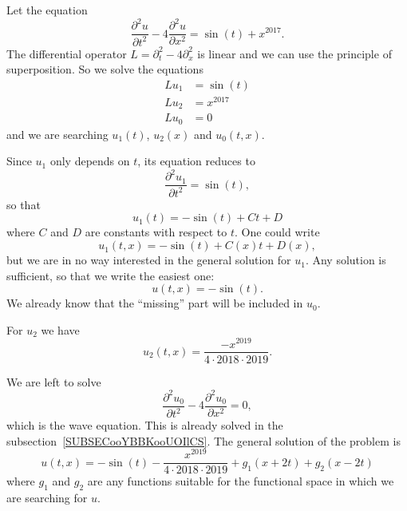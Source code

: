 \begin{example}
    Let the equation
    \begin{equation}
        \frac{ \partial^2u }{ \partial t^2 }-4\frac{ \partial^2u }{ \partial x^2 }=\sin(t)+x^{2017}.
    \end{equation}
    The differential operator \( L=\partial_t^2-4\partial_x^2\) is linear and we can use the principle of superposition. So we solve the equations
    \begin{subequations}
        \begin{align}
            Lu_1&=\sin(t)\\
            Lu_2&=x^{2017}\\
            Lu_0&=0
        \end{align}
    \end{subequations}
    and we are searching \( u_1(t)\), \( u_2(x)\) and \( u_0(t,x)\).

    Since \( u_1\) only depends on \( t\), its equation reduces to
    \begin{equation}
        \frac{ \partial^2u_1 }{ \partial t^2 }=\sin(t),
    \end{equation}
    so that
    \begin{equation}
        u_1(t)=-\sin(t)+Ct+D
    \end{equation}
    where \( C\) and \( D\) are constants with respect to \( t\). One could write
    \begin{equation}
        u_1(t,x)=-\sin(t)+C(x)t+D(x),
    \end{equation}
    but we are in no way interested in the general solution for \( u_1\). Any solution is sufficient, so that we write the easiest one:
    \begin{equation}
        u(t,x)=-\sin(t).
    \end{equation}
    We already know that the ``missing'' part will be included in \( u_0\).

    For \( u_2\) we have
    \begin{equation}
        u_2(t,x)=\frac{ -x^{2019} }{ 4\cdot 2018\cdot 2019 }.
    \end{equation}

    We are left to solve
    \begin{equation}
        \frac{ \partial^2u_0 }{ \partial t^2 }-4\frac{ \partial^2u_0 }{ \partial x^2 }=0,
    \end{equation}
    which is the wave equation. This is already solved in the subsection~\ref{SUBSECooYBBKooUOIlCS}. The general solution of the problem is
    \begin{equation}
        u(t,x)=-\sin(t)-\frac{ x^{2019} }{ 4\cdot 2018\cdot 2019 }+g_1(x+2t)+g_2(x-2t)
    \end{equation}
    where \( g_1\) and \( g_2\) are any functions suitable for the functional space in which we are searching for \( u\).
\end{example}

